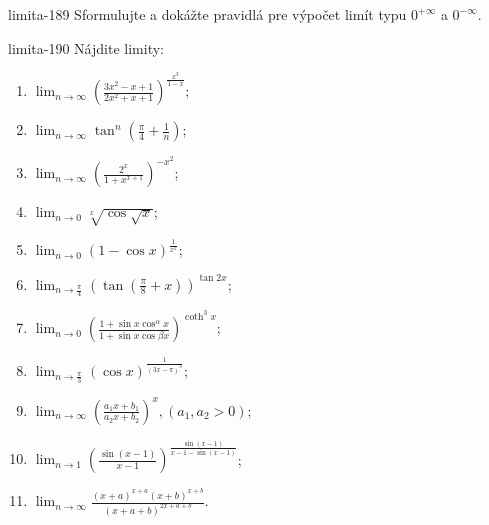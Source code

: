 \begin{defproblem}{limita-189}
Sformulujte a dokážte pravidlá pre výpočet limít typu $0^{+\infty}$ a $0^{-\infty}$.
\end{defproblem}

\begin{defproblem}{limita-190}
Nájdite limity:
\begin{multicols}{2}
\begin{enumerate}
    \item $\lim_{n \rightarrow \infty} (\frac{3x^2-x+1}{2x^2+x+1})^{\frac{x^3}{1-x}}$;
    \item $\lim_{n \rightarrow \infty} \tan ^n (\frac{\pi}{4}+\frac{1}{n})$;
    \item $\lim_{n \rightarrow \infty} (\frac{2^x}{1+x^{x+1}})^{-x^2}$;
    \item $\lim_{n \rightarrow 0} \sqrt[x]{\cos \sqrt{x}}$;
    \item $\lim_{n \rightarrow 0} (1-\cos x)^{\frac{1}{x^2}}$;
    \item $\lim_{n \rightarrow \frac{\pi}{4}} (\tan (\frac{\pi}{8}+x))^{\tan 2x}$;
    \item $\lim_{n \rightarrow 0} (\frac{1+\sin x \cos ^ \alpha x}{1+\sin x \cos \beta x})^{\coth ^3 x}$;
    \item $\lim_{n \rightarrow \frac{\pi}{3}} (\cos x)^{\frac{1}{(3x-\pi)^3}}$;
    \item $\lim_{n \rightarrow \infty} (\frac{a_1x+b_1}{a_2x+b_2})^x,(a_1,a_2>0)$;
    \item $\lim_{n \rightarrow 1} (\frac{\sin (x-1)}{x-1})^{\frac{\sin (x-1)}{x-1-\sin (x-1)}}$;
    \item $\lim_{n \rightarrow \infty} \frac{(x+a)^{x+a}(x+b)^{x+b}}{(x+a+b)^{2x+a+b}}$.
\end{enumerate}
\end{multicols}
\end{defproblem}

